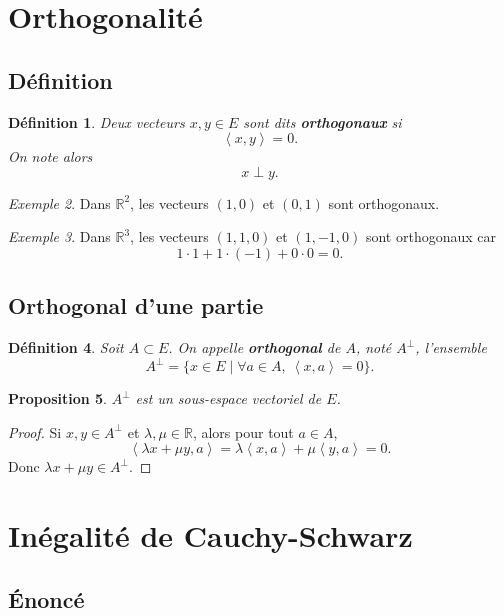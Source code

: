 \documentclass[11pt,a4paper]{article}
\newtheorem{definition}{Définition}[section]
\newtheorem{proposition}[definition]{Proposition}
\theoremstyle{remark}
\newtheorem{exemple}[definition]{Exemple}
\newcommand{\R}{\mathbb{R}}
\newcommand{\scal}[2]{\left\langle #1,#2\right\rangle}
\newcommand{\Orth}{\perp}
\begin{document}
\section{Orthogonalité}

\subsection{Définition}

\begin{definition}
Deux vecteurs \(x,y\in E\) sont dits \textbf{orthogonaux} si
\[
\scal{x}{y}=0.
\]
On note alors
\[
x\Orth y.
\]
\end{definition}

\begin{exemple}
Dans \(\R^2\), les vecteurs \((1,0)\) et \((0,1)\) sont orthogonaux.
\end{exemple}

\begin{exemple}
Dans \(\R^3\), les vecteurs \((1,1,0)\) et \((1,-1,0)\) sont orthogonaux car
\[
1\cdot 1+1\cdot(-1)+0\cdot 0=0.
\]
\end{exemple}

\subsection{Orthogonal d’une partie}

\begin{definition}
Soit \(A\subset E\). On appelle \textbf{orthogonal} de \(A\), noté \(A^\Orth\), l’ensemble
\[
A^\Orth=\{x\in E\mid \forall a\in A,\ \scal{x}{a}=0\}.
\]
\end{definition}

\begin{proposition}
\(A^\Orth\) est un sous-espace vectoriel de \(E\).
\end{proposition}

\begin{proof}
Si \(x,y\in A^\Orth\) et \(\lambda,\mu\in\R\), alors pour tout \(a\in A\),
\[
\scal{\lambda x+\mu y}{a}
=
\lambda\scal{x}{a}+\mu\scal{y}{a}
=0.
\]
Donc \(\lambda x+\mu y\in A^\Orth\).
\end{proof}

\section{Inégalité de Cauchy-Schwarz}

\subsection{Énoncé}
\end{document}
